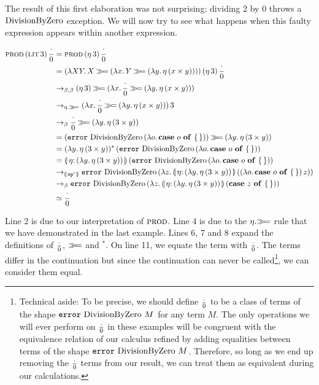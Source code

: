 The result of this first elaboration was not surprising: dividing 2 by 0
throws a $\operatorname{DivisionByZero}$ exception. We will now try to see what happens when
this faulty expression appears within another expression.

\begin{align*}
  \app{\prode}{\litec{3}}{\dbze}
  &= \app{\prode}{(\ap{\eta}{3})}{\dbze} \\
  &= \app{(\lam{X Y}{X \hsbind (\lam{x}{Y \hsbind (\lam{y}{\ap{\eta}
          {(x \times y)}})})})}
      {(\ap{\eta}{3})}{\dbze} \\
  &\to_{\beta,\beta} (\ap{\eta}{3}) \hsbind (\lam{x}{\dbze \hsbind (\lam{y}{\ap{\eta}
          {(x \times y)}})}) \\
  &\to_{\eta.\hsbind} \ap{(\lam{x}{\dbze \hsbind (\lam{y}{\ap{\eta}
          {(x \times y)}})})}{3} \\
  &\to_{\beta} \dbze \hsbind (\lam{y}{\ap{\eta} {(3 \times y)}}) \\
  &= (\app{\op{error}}{\dbzelong}{(\lam{o}{\absurd{o}})}) \hsbind (\lam{y}{\ap{\eta} {(3 \times y)}}) \\
  &= \ap{(\lam{y}{\ap{\eta} {(3 \times y)}})^*}{(\app{\op{error}}{\dbzelong}{(\lam{o}{\absurd{o}})})} \\
  &= \ap{\banana{\onto{\eta}{(\lam{y}{\ap{\eta} {(3 \times y)}})}}}{(\app{\op{error}}{\dbzelong}{(\lam{o}{\absurd{o}})})} \\
  &\to_{\banana{\op{op}'}} \app{\op{error}}{\dbzelong}{(\lam{z}{\ap{\banana{\onto{\eta}{(\lam{y}{\ap{\eta} {(3 \times y)}})}}}{(\ap{(\lam{o}{\absurd{o}})}{z})}})} \\
  &\to_{\beta} \app{\op{error}}{\dbzelong}{(\lam{z}{\ap{\banana{\onto{\eta}{(\lam{y}{\ap{\eta} {(3 \times y)}})}}}{(\absurd{z})}})} \\
  &\simeq \dbze
\end{align*}

Line 2 is due to our interpretation of $\textsc{prod}$. Line 4 is due to the
$\eta.\mathbin{\gg\!=}$ rule that we have demonstrated in the last example. Lines 6,
7 and 8 expand the definitions of $\frac{\cdot}{0}$, $\mathbin{\gg\!=}$ and $^*$. On line 11,
we equate the term with $\frac{\cdot}{0}$. The terms differ in the continuation but
since the continuation can never be called\footnote{Technical aside: To be
  precise, we should define $\frac{\cdot}{0}$ to be a class of terms of the shape
  $\mathtt{error}\,\operatorname{DivisionByZero}\,M$ for any term $M$. The only operations we
  will ever perform on $\frac{\cdot}{0}$ in these examples will be congruent with the
  equivalence relation of our calculus refined by adding equalities between
  terms of the shape $\mathtt{error}\,\operatorname{DivisionByZero}\,M$. Therefore, so long
  as we end up removing the $\frac{\cdot}{0}$ terms from our result, we can treat
  them as equivalent during our calculations.}, we can consider them equal.

